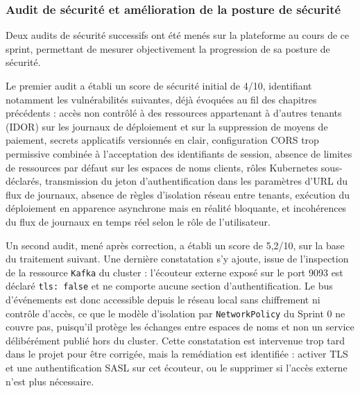 \subsubsection{Audit de sécurité et amélioration de la posture de sécurité}

Deux audits de sécurité successifs ont été menés sur la plateforme au cours de ce sprint, permettant de mesurer objectivement la progression de sa posture de sécurité.

Le premier audit a établi un score de sécurité initial de 4/10, identifiant notamment les vulnérabilités suivantes, déjà évoquées au fil des chapitres précédents : accès non contrôlé à des ressources appartenant à d'autres tenants (IDOR) sur les journaux de déploiement et sur la suppression de moyens de paiement, secrets applicatifs versionnés en clair, configuration CORS trop permissive combinée à l'acceptation des identifiants de session, absence de limites de ressources par défaut sur les espaces de noms clients, rôles Kubernetes sous-déclarés, transmission du jeton d'authentification dans les paramètres d'URL du flux de journaux, absence de règles d'isolation réseau entre tenants, exécution du déploiement en apparence asynchrone mais en réalité bloquante, et incohérences du flux de journaux en temps réel selon le rôle de l'utilisateur.

Un second audit, mené après correction, a établi un score de 5,2/10, sur la base du traitement suivant. Une dernière constatation s'y ajoute, issue de l'inspection de la ressource \texttt{Kafka} du cluster : l'écouteur externe exposé sur le port 9093 est déclaré \texttt{tls: false} et ne comporte aucune section d'authentification. Le bus d'événements est donc accessible depuis le réseau local sans chiffrement ni contrôle d'accès, ce que le modèle d'isolation par \texttt{NetworkPolicy} du Sprint 0 ne couvre pas, puisqu'il protège les échanges entre espaces de noms et non un service délibérément publié hors du cluster. Cette constatation est intervenue trop tard dans le projet pour être corrigée, mais la remédiation est identifiée : activer TLS et une authentification SASL sur cet écouteur, ou le supprimer si l'accès externe n'est plus nécessaire.


